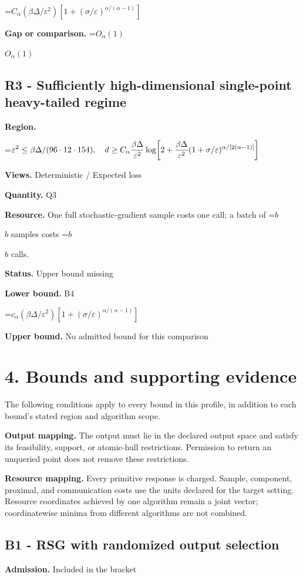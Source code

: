 \documentclass[10pt,a4paper]{article}
\newcommand{\AtlasMath}[1]{\par\begingroup\centering\setbox0=\hbox{$\displaystyle #1$}\ifdim\wd0>1.4\linewidth\typeout{ATLAS WIDE FORMULA: \the\wd0}\fi\ifdim\wd0>\linewidth\resizebox{\linewidth}{!}{\box0}\else\box0\fi\par\endgroup}
\newcommand{\AtlasInlineMath}[1]{\begingroup\setbox0=\hbox{$#1$}\ifdim\wd0>.4\linewidth\endgroup\AtlasMath{#1}\else\endgroup$#1$\fi}
\begin{document}
\AtlasMath{C_\alpha (\beta\Delta/\varepsilon^2)[1+(\sigma/\varepsilon)^{\alpha/(\alpha-1)}]}
\textbf{Gap or comparison.} \AtlasInlineMath{O_\alpha(1)}

\subsection{R3 - Sufficiently high-dimensional single-point heavy-tailed regime}
\textbf{Region.} 
\AtlasMath{\varepsilon^2\le\beta\Delta/(96\cdot12\cdot154),\quad d\ge C_\alpha {\beta\Delta\over\varepsilon^2}\log\!\left[2+{\beta\Delta\over\varepsilon^2}(1+\sigma/\varepsilon)^{\alpha/[2(\alpha-1)]}\right]}


\textbf{Views.} Deterministic / Expected loss

\textbf{Quantity.} Q3

\textbf{Resource.} One full stochastic-gradient sample costs one call; a batch of \AtlasInlineMath{b} samples costs \AtlasInlineMath{b} calls.

\textbf{Status.} Upper bound missing

\textbf{Lower bound.} B4

\AtlasMath{c_\alpha (\beta\Delta/\varepsilon^2)[1+(\sigma/\varepsilon)^{\alpha/(\alpha-1)}]}
\textbf{Upper bound.} No admitted bound for this comparison

\section{4. Bounds and supporting evidence}
The following conditions apply to every bound in this profile, in addition to each bound's stated region and algorithm scope.

\textbf{Output mapping.} The output must lie in the declared output space and satisfy its feasibility, support, or atomic-hull restrictions. Permission to return an unqueried point does not remove these restrictions.

\textbf{Resource mapping.} Every primitive response is charged. Sample, component, proximal, and communication costs use the units declared for the target setting. Resource coordinates achieved by one algorithm remain a joint vector; coordinatewise minima from different algorithms are not combined.

\subsection{B1 - RSG with randomized output selection}
\textbf{Admission.} Included in the bracket
\end{document}
